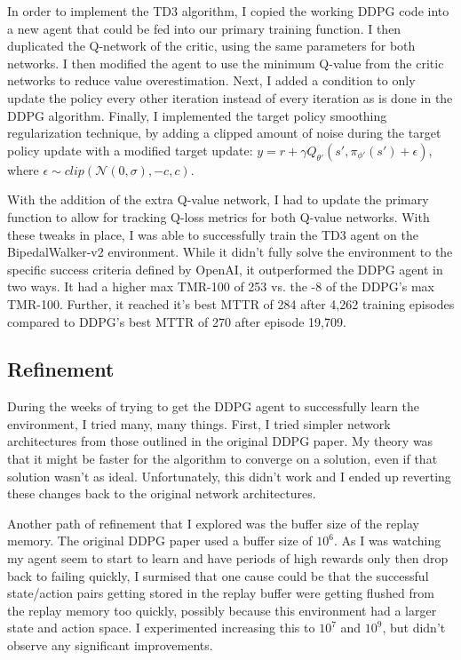 \documentclass{article}
\begin{document}
In order to implement the TD3 algorithm, I copied the working DDPG code into a new agent that could be fed into our primary training function. I then duplicated the Q-network of the critic, using the same parameters for both networks. I then modified the agent to use the minimum Q-value from the critic networks to reduce value overestimation. Next, I added a condition to only update the policy every other iteration instead of every iteration as is done in the DDPG algorithm. Finally, I implemented the target policy smoothing regularization technique, by adding a clipped amount of noise during the target policy update with a modified target update: $y=r+\gamma Q_{\theta'} (s', \pi_{\phi'}(s')+ \epsilon)$, where $\epsilon \sim clip(\mathcal{N}(0, \sigma), -c, c)$.

With the addition of the extra Q-value network, I had to update the primary function to allow for tracking Q-loss metrics for both Q-value networks. With these tweaks in place, I was able to successfully train the TD3 agent on the BipedalWalker-v2 environment. While it didn't fully solve the environment to the specific success criteria defined by OpenAI, it outperformed the DDPG agent in two ways. It had a higher max TMR-100 of 253 vs. the -8 of the DDPG's max TMR-100. Further, it reached it's best MTTR of 284 after 4,262 training episodes compared to DDPG's best MTTR of 270 after episode 19,709.


\subsection{Refinement}
During the weeks of trying to get the DDPG agent to successfully learn the environment, I tried many, many things. First, I tried simpler network architectures from those outlined in the original DDPG paper. My theory was that it might be faster for the algorithm to converge on a solution, even if that solution wasn't as ideal. Unfortunately, this didn't work and I ended up reverting these changes back to the original network architectures. 

Another path of refinement that I explored was the buffer size of the replay memory. The original DDPG paper used a buffer size of $10^{6}$. As I was watching my agent seem to start to learn and have periods of high rewards only then drop back to failing quickly, I surmised that one cause could be that the successful state/action pairs getting stored in the replay buffer were getting flushed from the replay memory too quickly, possibly because this environment had a larger state and action space. I experimented increasing this to $10^{7}$ and $10^{9}$, but didn't observe any significant improvements.
\end{document}
